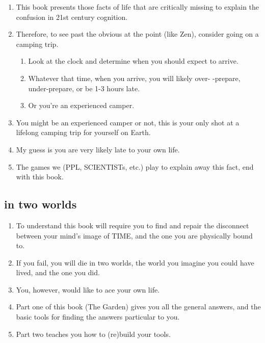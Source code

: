 \documentclass[
]{book}
\providecommand{\tightlist}{%
  \setlength{\itemsep}{0pt}\setlength{\parskip}{0pt}}
\begin{document}
\begin{enumerate}
\def\labelenumi{\arabic{enumi}.}
\setcounter{enumi}{12}
\tightlist
\item
  This book presents those facts of life that are critically missing to explain the confusion in 21st century cognition.
\item
  Therefore, to see past the obvious at the point (like Zen), consider going on a camping trip.

  \begin{enumerate}
  \def\labelenumii{\arabic{enumii}.}
  \tightlist
  \item
    Look at the clock and determine when you should expect to arrive.
  \item
    Whatever that time, when you arrive, you will likely over- -prepare, under-prepare, or be 1-3 hours late.
  \item
    Or you're an experienced camper.
  \end{enumerate}
\item
  You might be an experienced camper or not, this is your only shot at a lifelong camping trip for yourself on Earth.
\item
  My guess is you are very likely late to your own life.
\item
  The games we (PPL, SCIENTISTs, etc.) play to explain away this fact, end with this book.
\end{enumerate}

\hypertarget{in-two-worlds}{%
\subsection{in two worlds}\label{in-two-worlds}}

\begin{enumerate}
\def\labelenumi{\arabic{enumi}.}
\setcounter{enumi}{17}
\item
  To understand this book will require you to find and repair the disconnect between your mind's image of TIME, and the one you are physically bound to.
\item
  If you fail, you will die in two worlds, the world you imagine you could have
  lived, and the one you did.
\item
  You, however, would like to ace your own life.
\item
  Part one of this book (The Garden) gives you all the general answers, and the basic tools for finding the answers particular to you.
\item
  Part two teaches you how to (re)build your tools.
\end{enumerate}
\end{document}
